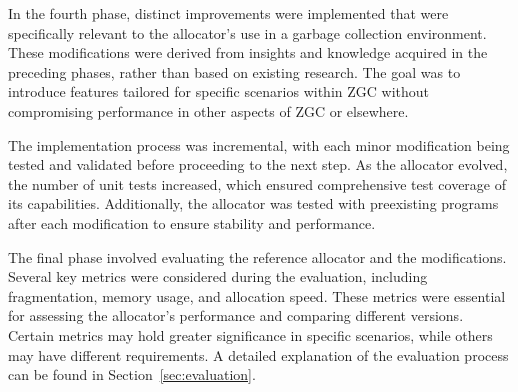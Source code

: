 In the fourth phase, distinct improvements were implemented that were specifically relevant to the allocator's use in a garbage collection environment. These modifications were derived from insights and knowledge acquired in the preceding phases, rather than based on existing research. The goal was to introduce features tailored for specific scenarios within ZGC without compromising performance in other aspects of ZGC or elsewhere.

The implementation process was incremental, with each minor modification being tested and validated before proceeding to the next step. As the allocator evolved, the number of unit tests increased, which ensured comprehensive test coverage of its capabilities. Additionally, the allocator was tested with preexisting programs after each modification to ensure stability and performance.

The final phase involved evaluating the reference allocator and the modifications. Several key metrics were considered during the evaluation, including fragmentation, memory usage, and allocation speed. These metrics were essential for assessing the allocator's performance and comparing different versions. Certain metrics may hold greater significance in specific scenarios, while others may have different requirements. A detailed explanation of the evaluation process can be found in Section~\ref{sec:evaluation}.

